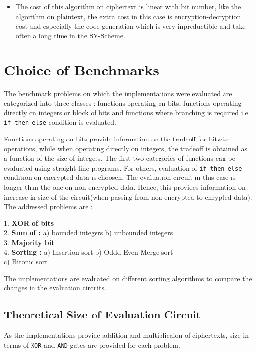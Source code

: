 \documentclass{acm_proc_article-sp}
\begin{document}
\begin{itemize}
\item The cost of this algorithm on ciphertext is linear with bit number, like  the algorithm on plaintext, the extra cost in this case is encryption-decryption cost and especially the code generation which is very inpreductible and take often a long time in the SV-Scheme.
\end{itemize}
\section{Choice of Benchmarks}

The benchmark problems on which the implementations were evaluated are categorized into three classes : functions operating on bits, functions operating directly on integers or block of bits and functions where branching is required i.e \texttt{if-then-else} condition is evaluated. 

Functions operating on bits provide information on the tradeoff for bitwise operations, while when operating directly on integers, the tradeoff is obtained as a function of the size of integers. The first two categories of functions can be evaluated using straight-line programs. For others, evaluation of \texttt{if-then-else} condition on encrypted data is choosen.  The evaluation circuit in this case is longer than the one on non-encrypted data. Hence, this provides information on increase in size of the circuit(when passing from non-encrypted to enrypted data). The addressed problems are : 

1. \textbf{XOR of bits}\\
2. \textbf{Sum of :}  
\newline\noindent
\phantom{x}\hspace{3ex} a) bounded integers 
 b) unbounded integers\\ 
3. \textbf{Majority bit} \\
4. \textbf{Sorting : } \newline\noindent
\phantom{x}\hspace{3ex} a) Insertion sort b) Oddd-Even Merge sort \\
	\phantom{x}\hspace{3ex} 	    c) Bitonic sort 

The implementations are evaluated on different sorting algorithms to compare the changes in the evaluation circuits.

\subsection{Theoretical Size of Evaluation Circuit}
As the implementations provide addition and multiplicaion of ciphertexts,  size in terms of \texttt{XOR} and \texttt{AND} gates are provided for each problem. 
\end{document}
